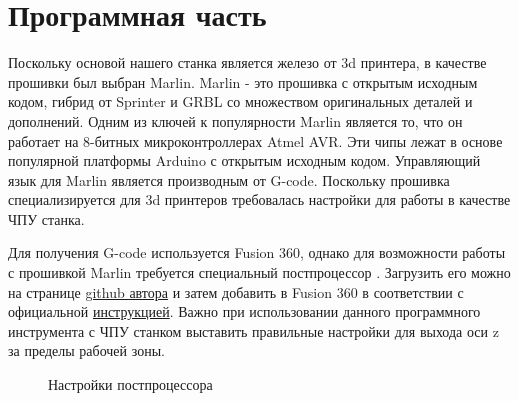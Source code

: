 \documentclass[a4paper,12pt]{article}
\theoremstyle{plain}                          %
\theoremstyle{definition}                     %
\theoremstyle{remark}                         %
\begin{document}
\section{Программная часть}

Поскольку основой нашего станка является железо от 3d принтера, в
качестве прошивки был выбран Marlin. Marlin - это прошивка с открытым
исходным кодом, гибрид от Sprinter и GRBL со множеством оригинальных
деталей и дополнений. Одним из ключей к популярности Marlin является то,
что он работает на 8-битных микроконтроллерах Atmel AVR. Эти чипы лежат
в основе популярной платформы Arduino с открытым исходным кодом.
Управляющий язык для Marlin является производным от G-code.
Поскольку прошивка специализируется для 3d принтеров требовалась настройки для работы в качестве ЧПУ станка.

Для получения G-code используется Fusion 360, однако для возможности работы с прошивкой Marlin требуется специальный постпроцессор \cite{themakermachine_mini}.
Загрузить его можно на странице \href{https://github.com/guffy1234/mpcnc_posts_processor}{github автора} и затем добавить в Fusion 360
в соответствии с официальной
\href{https://knowledge.autodesk.com/support/fusion-360/learn-explore/caas/sfdcarticles/sfdcarticles/How-to-add-a-Post-Processor-to-your-Personal-Posts-in-Fusion-360.html}{инструкцией}.
Важно при использовании данного программного инструмента с ЧПУ станком выставить правильные настройки для выхода оси z за пределы рабочей зоны.

\begin{figure}[H]
    \caption{Настройки постпроцессора}
\end{figure}

\newpage
\end{document}
